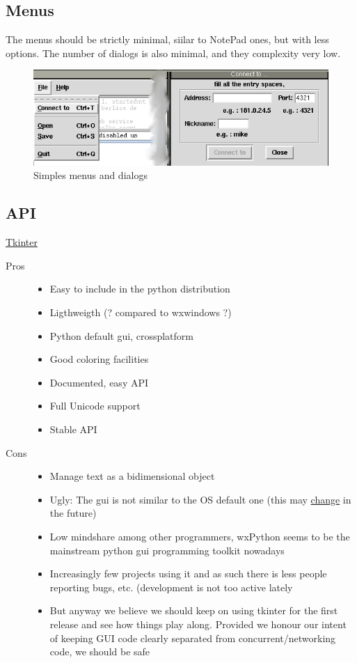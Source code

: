 \documentclass{report}
\begin{document}
\subsection{Menus}

The menus should be strictly minimal, siilar to NotePad ones, but with less options.
The number of dialogs is also minimal, and they complexity very low.

\begin{figure}[htbp]
 \begin{center}
    \includegraphics[angle=0,width=0.5\linewidth]{schemas/simples_menus_and_dialogs.png}
 \end{center}
 \caption{Simples menus and dialogs}
 \label{fig:simplesmenusanddialogs}
\end{figure}


\subsection{API}

\href{http://www.python.org/topics/tkinter/}{Tkinter}

\begin{description}
\item [Pros]
    \begin{itemize}
    \item Easy to include in the python distribution
    \item Ligthweigth (? compared to wxwindows ?)
    \item Python default gui, crossplatform
    \item Good coloring facilities
    \item Documented, easy API
    \item Full Unicode support
    \item Stable API
    \end{itemize}

\item [Cons]
    \begin{itemize}
    \item Manage text as a bidimensional object
    \item Ugly: The gui is not similar to the OS default one (this may \href{http://tcl.projectforum.com/tk/47}{change} in the future)
    \item Low mindshare among other programmers, wxPython seems to be the mainstream python gui programming toolkit nowadays
    \item Increasingly few projects using it and as such there is less people reporting bugs, etc. (development is not too active lately
    \item But anyway we believe we should keep on using tkinter for the first release and see how things play along. Provided we honour our intent of keeping GUI code clearly separated from concurrent/networking code, we should be safe
    \end{itemize}
\end{description}
\end{document}
